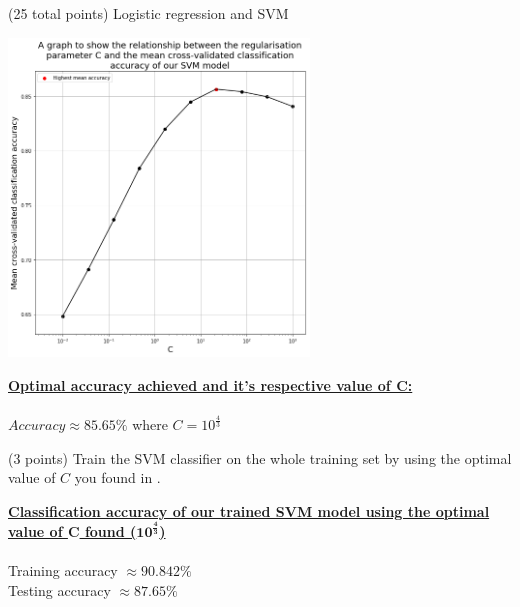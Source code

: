 \documentclass[12pt]{article}
\begin{document}
\begin{question}{(25 total points) Logistic regression and SVM}
\begin{subquestion}
   

      \begin{answerbox}{30em}
        \begin{center}
        \includegraphics[width=0.6\textwidth]{images/q25.png}
        \end{center}
        \textbf{\underline{Optimal accuracy achieved and it's respective value of C:}} \\
        \\
        \footnotesize{$Accuracy \approx 85.65 \%$  where  $C = 10^{\frac{4}{3}}$}
      \end{answerbox}
  


   \end{subquestion}
   \begin{subquestion}{(3 points)
       Train the SVM classifier on the whole training set by using the
       optimal value of $C$ you found in . 
     } \label{Q2.6}


       

      \begin{answerbox}{10em}
        \textbf{\underline{Classification accuracy of our trained SVM model using the optimal}} \\
        \textbf{\underline{value of $\mathbf{C}$ found ($\mathbf{10^{\frac{4}{3}}}$)}}\\
        \\
        \footnotesize{
        Training accuracy $\approx 90.842\%$\\
        Testing accuracy $\approx 87.65\%$
        }
      \end{answerbox}
  


   \end{subquestion}
%
%

\end{question}
\clearpage
%
%
\end{document}
